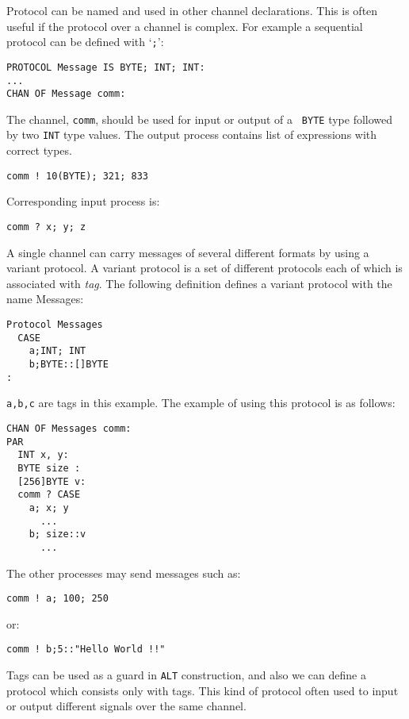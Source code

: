 Protocol can be named and used in other channel declarations.  This is
often useful if the protocol over a channel is complex.  For example a
sequential protocol can be defined with `{\tt ;}':
\begin{lin}
\begin{verbatim}
PROTOCOL Message IS BYTE; INT; INT:
...
CHAN OF Message comm:
\end{verbatim}
\end{lin}
The channel, {\tt comm}, should be used for input or output of a {\tt
BYTE} type followed by two {\tt INT} type values.  The output process
contains list of expressions with correct types.
\begin{lin}
\begin{verbatim}
comm ! 10(BYTE); 321; 833
\end{verbatim}
\end{lin}
Corresponding input process is:
\begin{lin}
\begin{verbatim}
comm ? x; y; z
\end{verbatim}
\end{lin}

A single channel can carry messages of several different formats by
using a variant protocol.  A variant protocol is a set of different
protocols each of which is associated with {\em tag}.  The following
definition defines a variant protocol with the name Messages:
\begin{lin}
\begin{verbatim}
Protocol Messages
  CASE
    a;INT; INT
    b;BYTE::[]BYTE
:
\end{verbatim}
\end{lin}
{\tt a,b,c} are tags in this example.  The example of using this
protocol is as follows:
\begin{lin}
\begin{verbatim}
CHAN OF Messages comm:
PAR
  INT x, y:
  BYTE size :
  [256]BYTE v:
  comm ? CASE
    a; x; y
      ...
    b; size::v
      ...
\end{verbatim}
\end{lin}
The other processes may send messages such as:
\begin{lin}
\begin{verbatim}
comm ! a; 100; 250
\end{verbatim}
\end{lin}
or:
\begin{lin}
\begin{verbatim}
comm ! b;5::"Hello World !!"
\end{verbatim}
\end{lin}
Tags can be used as a guard in {\tt ALT} construction, and also we can
define a protocol which consists only with tags.  This kind of
protocol often used to input or output different signals over the same
channel.

